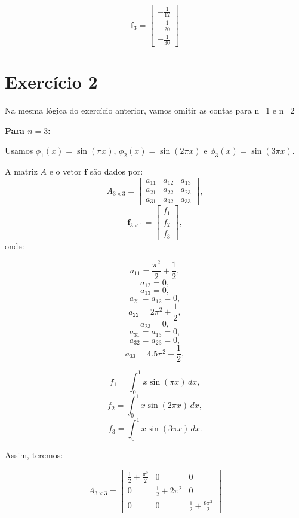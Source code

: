 \documentclass{article}
\begin{document}
\[
\mathbf{f}_{3} = \begin{bmatrix}
    -\frac{1}{12} \\
    -\frac{1}{20} \\
    -\frac{1}{30}
    \end{bmatrix}
\]

\section{Exercício 2}

Na mesma lógica do exercício anterior, vamos omitir as contas para n=1 e n=2

\textbf{Para \( n = 3 \):}

Usamos \( \phi_1(x) = \sin(\pi x) \), \( \phi_2(x) = \sin(2\pi x) \) e \( \phi_3(x) = \sin(3\pi x) \).

A matriz \( A \) e o vetor \( \mathbf{f} \) são dados por:
\[
A_{3 \times 3} = \begin{bmatrix}
a_{11} & a_{12} & a_{13} \\
a_{21} & a_{22} & a_{23} \\
a_{31} & a_{32} & a_{33}
\end{bmatrix},
\]
\[
\mathbf{f}_{3 \times 1} = \begin{bmatrix}
f_1 \\
f_2 \\
f_3
\end{bmatrix},
\]
onde:
\begin{multicols}{2}
    \noindent
    \[
    a_{11} = \frac{\pi^2}{2} + \frac{1}{2},
    \]
    \[
    a_{12} = 0,
    \]
    \[
    a_{13} = 0,
    \]
    \[
    a_{21} = a_{12} = 0,
    \]
    \[
    a_{22} = 2\pi^2 + \frac{1}{2},
    \]
    \[
    a_{23} = 0,
    \]
    \[
    a_{31} = a_{13} = 0,
    \]
    \[
    a_{32} = a_{23} = 0,
    \]
    \[
    a_{33} = 4.5\pi^2 + \frac{1}{2},
    \]
    
    \columnbreak
    
    \noindent
    \[
    f_1 = \int_0^1 x \sin(\pi x) \, dx,
    \]
    \[
    f_2 = \int_0^1 x \sin(2\pi x) \, dx,
    \]
    \[
    f_3 = \int_0^1 x \sin(3\pi x) \, dx.
    \]
    \end{multicols}

Assim, teremos:

\[
A_{3 \times 3} = \begin{bmatrix}
    \frac{1}{2} + \frac{\pi^2}{2} & 0 & 0 \\
    0 & \frac{1}{2} + 2\pi^2 & 0 \\
    0 & 0 & \frac{1}{2} + \frac{9\pi^2}{2}
    \end{bmatrix}
\]
\end{document}

